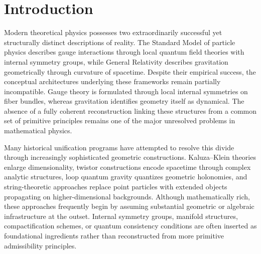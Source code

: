 \documentclass[12pt,a4paper]{article}
\begin{document}
\begin{abstract}
The framework does not claim a completed derivation of the Standard Model or
gravity. It establishes a mathematically structured reconstruction program
clarifying which portions of unification can presently be treated rigorously,
which require additional assumptions, and which remain open conjectures. A
summary of explicit proof obligations is provided. The framework developed below
should be interpreted as a structured derivation program with explicit
unresolved proof obligations rather than as a completed unified theory.
\end{abstract}

\tableofcontents
\newpage

\section{Introduction}

Modern theoretical physics possesses two extraordinarily successful yet
structurally distinct descriptions of reality. The Standard Model of particle
physics describes gauge interactions through local quantum field theories with
internal symmetry groups, while General Relativity describes gravitation
geometrically through curvature of spacetime. Despite their empirical success,
the conceptual architectures underlying these frameworks remain partially
incompatible. Gauge theory is formulated through local internal symmetries on
fiber bundles, whereas gravitation identifies geometry itself as dynamical. The
absence of a fully coherent reconstruction linking these structures from a
common set of primitive principles remains one of the major unresolved problems
in mathematical physics.

Many historical unification programs have attempted to resolve this divide
through increasingly sophisticated geometric constructions. Kaluza--Klein
theories enlarge dimensionality, twistor constructions encode spacetime through
complex analytic structures, loop quantum gravity quantizes geometric holonomies,
and string-theoretic approaches replace point particles with extended objects
propagating on higher-dimensional backgrounds. Although mathematically rich,
these approaches frequently begin by assuming substantial geometric or algebraic
infrastructure at the outset. Internal symmetry groups, manifold structures,
compactification schemes, or quantum consistency conditions are often inserted as
foundational ingredients rather than reconstructed from more primitive
admissibility principles.
\end{document}
